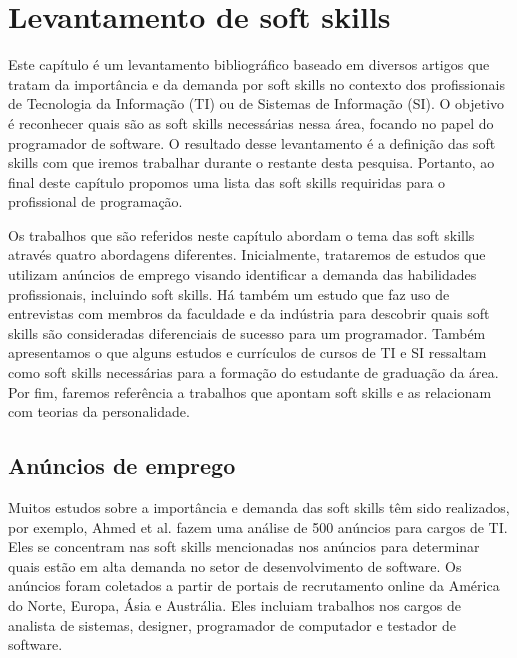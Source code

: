 

\chapter{Levantamento de soft skills}

\label{chap:research}
\thispagestyle{empty} %

Este capítulo é um levantamento bibliográfico baseado em diversos artigos que tratam da importância e da demanda por soft skills no contexto dos profissionais de Tecnologia da Informação (TI) ou de Sistemas de Informação (SI). O objetivo é reconhecer quais são as soft skills necessárias nessa área, focando no papel do programador de software. O resultado desse levantamento é a definição das soft skills com que iremos trabalhar durante o restante desta pesquisa. Portanto, ao final deste capítulo propomos uma lista das soft skills requiridas para o profissional de programação.

Os trabalhos que são referidos neste capítulo abordam o tema das soft skills através quatro abordagens diferentes. Inicialmente, trataremos de estudos que utilizam anúncios de emprego visando identificar a demanda das habilidades profissionais, incluindo soft skills. Há também um estudo que faz uso de entrevistas com membros da faculdade e da indústria para descobrir quais soft skills são consideradas diferenciais de sucesso para um programador. Também apresentamos o que alguns estudos e currículos de cursos de TI e SI ressaltam como soft skills necessárias para a formação do estudante de graduação da área. Por fim, faremos referência a trabalhos que apontam soft skills e as relacionam com teorias da personalidade.

\section{Anúncios de emprego}

Muitos estudos sobre a importância e demanda das soft skills têm sido realizados, por exemplo, Ahmed et al. \cite{ahmed:12} fazem uma análise de 500 anúncios para cargos de TI. Eles se concentram nas soft skills mencionadas nos anúncios para determinar quais estão em alta demanda no setor de desenvolvimento de software. Os anúncios foram coletados a partir de portais de recrutamento online da América do Norte, Europa, Ásia e Austrália. Eles incluiam trabalhos nos cargos de analista de sistemas, designer, programador de computador e testador de software.

